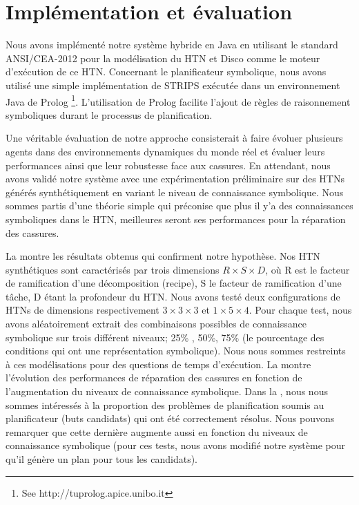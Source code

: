 \documentclass[a4paper,twoside,french]{article}
\begin{document}
		\section{Implémentation et évaluation}
		Nous avons implémenté notre système hybride en Java en utilisant le standard ANSI/CEA-2012 \cite{rich2009building} pour la modélisation du HTN et Disco \cite{rich2012using} comme le moteur d'exécution de ce HTN. Concernant le planificateur symbolique, nous avons utilisé une simple implémentation de STRIPS  exécutée dans un environnement Java de Prolog \footnote{See http://tuprolog.apice.unibo.it}. L'utilisation de Prolog facilite l'ajout de règles de raisonnement symboliques durant le processus de planification. 
		\par Une véritable évaluation de notre approche consisterait à faire évoluer plusieurs agents dans des environnements dynamiques du monde réel et évaluer leurs performances ainsi que leur robustesse face aux cassures. En attendant, nous avons validé notre système avec une expérimentation préliminaire sur des HTNs générés synthétiquement en variant le niveau de connaissance symbolique. Nous sommes partis d'une théorie simple qui préconise que plus il y'a des connaissances symboliques dans le HTN, meilleures seront ses performances pour la réparation des cassures.
		\par La  montre les résultats obtenus qui confirment notre hypothèse. Nos HTN synthétiques sont caractérisés par trois dimensions $R \times S \times D$, où R est le facteur de ramification d'une décomposition (recipe), S le facteur de ramification d'une tâche, D étant la profondeur du HTN. Nous avons testé deux configurations de HTNs de dimensions respectivement $3\times 3\times 3$ et $1\times 5\times 4$. Pour chaque test, nous avons aléatoirement extrait des combinaisons possibles de connaissance symbolique sur trois différent niveaux; 25\% , 50\%, 75\% (le pourcentage des conditions qui ont une représentation symbolique). Nous nous sommes restreints à ces modélisations pour des questions de temps d'exécution. La  montre l'évolution des performances de réparation des cassures en fonction de l'augmentation du niveaux de connaissance symbolique. Dans la , nous nous sommes intéressés à la proportion des problèmes de planification soumis au planificateur (buts candidats) qui ont été correctement résolus. Nous pouvons remarquer que cette dernière augmente aussi en fonction du niveaux de connaissance symbolique (pour ces tests, nous avons modifié notre système pour qu'il génère un plan pour tous les candidats).
\end{document}
